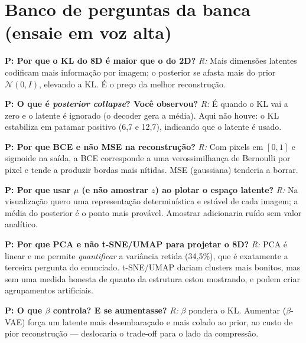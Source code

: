 \documentclass[11pt,a4paper]{article}
\newcommand{\Q}[1]{\textbf{P: #1}}
\newcommand{\A}[1]{\textit{R:} #1}
\begin{document}
\section{Banco de perguntas da banca (ensaie em voz alta)}

\begin{pergunta}
\Q{Por que o KL do 8D é maior que o do 2D?} \A{Mais dimensões latentes
codificam mais informação por imagem; o posterior se afasta mais do prior
$\mathcal{N}(0,I)$, elevando a KL. É o preço da melhor reconstrução.}
\end{pergunta}

\begin{pergunta}
\Q{O que é \textit{posterior collapse}? Você observou?} \A{É quando o KL vai a
zero e o latente é ignorado (o decoder gera a média). Aqui não houve: o KL
estabiliza em patamar positivo (6,7 e 12,7), indicando que o latente é usado.}
\end{pergunta}

\begin{pergunta}
\Q{Por que BCE e não MSE na reconstrução?} \A{Com pixels em $[0,1]$ e sigmoide
na saída, a BCE corresponde a uma verossimilhança de Bernoulli por pixel e tende
a produzir bordas mais nítidas. MSE (gaussiana) tenderia a borrar.}
\end{pergunta}

\begin{pergunta}
\Q{Por que usar $\mu$ (e não amostrar $z$) ao plotar o espaço latente?} \A{Na
visualização quero uma representação determinística e estável de cada imagem; a
média do posterior é o ponto mais provável. Amostrar adicionaria ruído sem valor
analítico.}
\end{pergunta}

\begin{pergunta}
\Q{Por que PCA e não t-SNE/UMAP para projetar o 8D?} \A{PCA é linear e me
permite \emph{quantificar} a variância retida (34,5\%), que é exatamente a
terceira pergunta do enunciado. t-SNE/UMAP dariam clusters mais bonitos, mas sem
uma medida honesta de quanto da estrutura estou mostrando, e podem criar
agrupamentos artificiais.}
\end{pergunta}

\begin{pergunta}
\Q{O que $\beta$ controla? E se aumentasse?} \A{$\beta$ pondera o KL. Aumentar
($\beta$-VAE) força um latente mais desembaraçado e mais colado ao prior, ao
custo de pior reconstrução --- deslocaria o trade-off para o lado da compressão.}
\end{pergunta}
\end{document}

